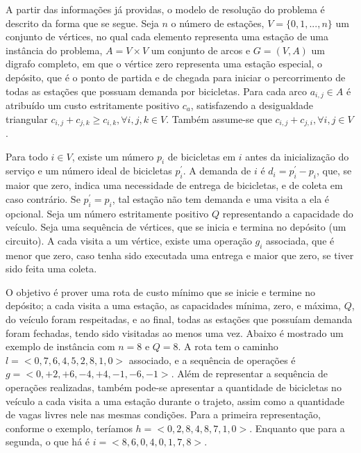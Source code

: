\par A partir das informações já providas, o modelo de resolução do problema é descrito da forma que se segue. Seja \begin{math} n \end{math} o número de estações, \begin{math} V = \{0, 1, ..., n\} \end{math} um conjunto de vértices, no qual cada elemento representa uma estação de uma instância do problema, \begin{math} A = V \times V \end{math} um conjunto de arcos e \begin{math} G = (V, A) \end{math} um digrafo completo, em que o vértice zero representa uma estação especial, o depósito, que é o ponto de partida e de chegada para iniciar o percorrimento de todas as estações que possuam demanda por bicicletas. Para cada arco \begin{math} a_{i, j} \in A \end{math} é atribuído um custo estritamente positivo \(c_a\), satisfazendo a desigualdade triangular \( c_{i,j} + c_{j, k} \geq c_{i,k}, \forall{i, j, k} \in V \). Também assume-se que \( c_{i,j} + c_{j, i}, \forall{i, j} \in V \). 

\par Para todo \(i \in V \), existe um número \( p_i \) de bicicletas em \( i \) antes da inicialização do serviço e um número ideal de bicicletas \( p_i^{'} \). A demanda de \( i \) é \( d_i = p_i^{'} - p_i  \), que, se maior que zero, indica uma necessidade de entrega de bicicletas, e de coleta em caso contrário. Se \( p_i^{'} = p_i \), tal estação não tem demanda e uma visita a ela é opcional. Seja um número estritamente positivo \( Q \) representando a capacidade do veículo. Seja uma sequência de vértices, que se inicia e termina no depósito (um circuito). A cada visita a um vértice, existe uma operação \( g_i \) associada, que é menor que zero, caso tenha sido executada uma entrega e maior que zero, se tiver sido feita uma coleta. \par O objetivo é prover uma rota de custo mínimo que se inicie e termine no depósito; a cada visita a uma estação, as capacidades mínima, zero, e máxima, \(Q\), do veículo foram respeitadas, e ao final, todas as estações que possuíam demanda foram fechadas, tendo sido visitadas ao menos uma vez. Abaixo é mostrado um exemplo de instância com \( n = 8 \) e \( Q = 8 \). A rota tem o caminho \( l = <0, 7, 6, 4, 5, 2, 8, 1, 0>\) associado, e a sequência de operações é \( g = <0, +2, +6, -4, +4, -1, -6, -1>\). Além de representar a sequência de operações realizadas, também pode-se apresentar a quantidade de bicicletas no veículo a cada visita a uma estação durante o trajeto, assim como a quantidade de vagas livres nele nas mesmas condições. Para a primeira representação, conforme o exemplo, teríamos \(h = <0, 2, 8, 4, 8, 7, 1, 0>\). Enquanto que para a segunda, o que há é \( i = <8, 6, 0, 4, 0, 1, 7, 8>\). 


